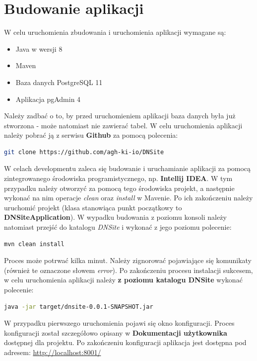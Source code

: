 \documentclass[11pt]{article}
\begin{document}
\section{Budowanie aplikacji}
W celu uruchomienia zbudowania i uruchomienia aplikacji wymagane są:
\begin{itemize}
\item Java w wersji 8
\item Maven
\item Baza danych PostgreSQL 11
\item Aplikacja pgAdmin 4
\end{itemize}
Należy zadbać o to, by przed uruchomieniem aplikacji baza danych była już stworzona - może natomiast nie zawierać tabel.
W celu uruchomienia aplikacji należy pobrać ją z serwisu \textbf{Github} za pomocą polecenia:
\begin{lstlisting}[language=bash]
git clone https://github.com/agh-ki-io/DNSite
\end{lstlisting}
W celach developmentu zaleca się budowanie i uruchamianie aplikacji za pomocą zintegrowanego środowiska programistycznego, np. \textbf{Intellij IDEA}. W tym przypadku należy otworzyć za pomocą tego środowiska projekt, a następnie wykonać na nim operacje \emph{clean} oraz \emph{install} w Mavenie. Po ich zakończeniu należy uruchomić projekt (klasa stanowiąca punkt początkowy to \textbf{DNSiteApplication}). \newline
W wypadku budowania z poziomu konsoli należy natomiast przejść do katalogu \emph{DNSite} i wykonać z jego poziomu polecenie:
\begin{lstlisting}[language=bash]
mvn clean install
\end{lstlisting}
Proces może potrwać kilka minut. Należy zignorować pojawiające się komunikaty (również te oznaczone słowem \emph{error}). Po zakończeniu procesu instalacji sukcesem, w celu uruchomienia aplikacji należy \textbf{z poziomu katalogu DNSite} wykonać polecenie:
\begin{lstlisting}[language=bash]
java -jar target/dnsite-0.0.1-SNAPSHOT.jar
\end{lstlisting}
W przypadku pierwszego uruchomienia pojawi się okno konfiguracji. Proces konfiguracji został szczegółowo opisany w \textbf{Dokumentacji użytkownika} dostępnej dla projektu. Po zakończeniu konfiguracji aplikacja jest dostępna pod adresem: \url{http://localhost:8001/}
\end{document}
